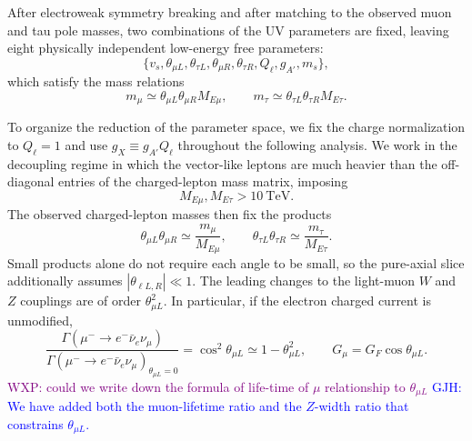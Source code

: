 \documentclass[onecolumn, aps, nofootinbib, prd, preprint, floats, floatfix, amsmath, amssymb, superscriptaddress, preprintnumbers]{revtex4-2}
\newcommand{\GJH}[1]{\textcolor{blue}{GJH: #1}}
\newcommand{\WXP}[1]{\textcolor{purple}{WXP: #1}}
\begin{document}
After electroweak symmetry breaking and after matching to the observed muon and tau pole masses, two combinations of the UV parameters are fixed, leaving eight physically independent low-energy free parameters:
\begin{equation}
    \{v_s, \theta_{\mu L}, \theta_{\tau L}, \theta_{\mu R},\theta_{\tau R}, Q_\ell, g_{A'}, m_s \},
    \end{equation}
which satisfy the mass relations
\begin{equation}
    m_\mu\simeq \theta_{\mu L} \theta_{\mu R} M_{E\mu}, \qquad
    m_\tau\simeq \theta_{\tau L} \theta_{\tau R} M_{E\tau}.
    \end{equation}

To organize the reduction of the parameter space, we fix the charge normalization to $Q_\ell=1$ and use $g_X\equiv g_{A'}Q_\ell$ throughout the following analysis. We work in the decoupling regime in which the vector-like leptons are much heavier than the off-diagonal entries of the charged-lepton mass matrix, imposing
\begin{equation}
M_{E\mu},M_{E\tau}>10~\mathrm{TeV}.
\end{equation}
The observed charged-lepton masses then fix the products
\begin{equation}
\theta_{\mu L}\theta_{\mu R}\simeq\frac{m_\mu}{M_{E\mu}},
\qquad
\theta_{\tau L}\theta_{\tau R}\simeq\frac{m_\tau}{M_{E\tau}}.
\end{equation}
Small products alone do not require each angle to be small, so the pure-axial slice additionally assumes $|\theta_{\ell L,R}|\ll1$. The leading changes to the light-muon $W$ and $Z$ couplings are of order $\theta_{\mu L}^2$. In particular, if the electron charged current is unmodified,
\begin{equation}
\frac{\Gamma(\mu^-\to e^-\bar\nu_e\nu_\mu)}
{\Gamma(\mu^-\to e^-\bar\nu_e\nu_\mu)_{\theta_{\mu L}=0}}
=\cos^2\theta_{\mu L}
\simeq1-\theta_{\mu L}^2,
\qquad G_\mu=G_F\cos\theta_{\mu L}.
\label{eq:muon-lifetime-mixing}
\end{equation}
\WXP{could we write down the formula of life-time of $\mu$ relationship to $\theta_{\mu L}$}
\GJH{We have added both the muon-lifetime ratio and the $Z$-width ratio that constrains $\theta_{\mu L}$.}
\end{document}
